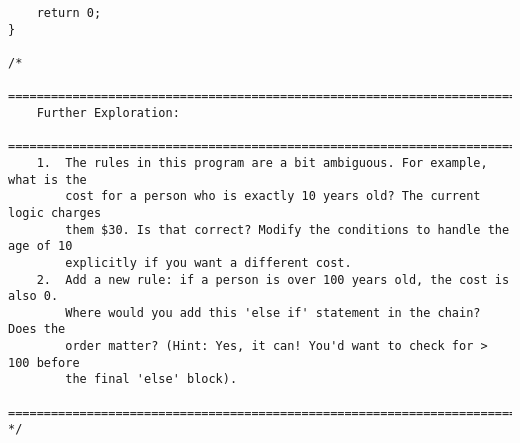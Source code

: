 \documentclass[11pt]{book}
\begin{document}
\begin{verbatim}
    return 0;
}

/*
    ================================================================================
    Further Exploration:
    ================================================================================
    1.  The rules in this program are a bit ambiguous. For example, what is the
        cost for a person who is exactly 10 years old? The current logic charges
        them $30. Is that correct? Modify the conditions to handle the age of 10
        explicitly if you want a different cost.
    2.  Add a new rule: if a person is over 100 years old, the cost is also 0.
        Where would you add this 'else if' statement in the chain? Does the
        order matter? (Hint: Yes, it can! You'd want to check for > 100 before
        the final 'else' block).
    ================================================================================
*/

\end{verbatim}
\clearpage
\end{document}

